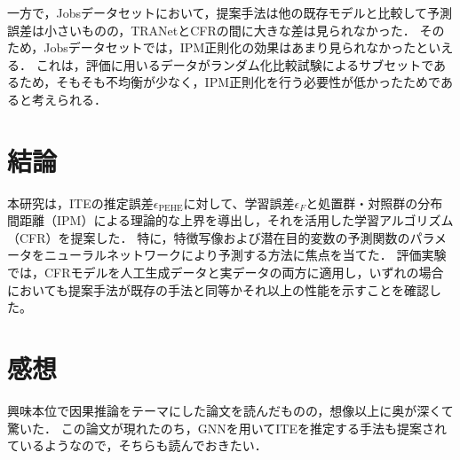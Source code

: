 \documentclass[dvipdfmx]{jreport}
\begin{document}
一方で，Jobsデータセットにおいて，提案手法は他の既存モデルと比較して予測誤差は小さいものの，TRANetとCFRの間に大きな差は見られなかった．
そのため，Jobsデータセットでは，IPM正則化の効果はあまり見られなかったといえる．
これは，評価に用いるデータがランダム化比較試験によるサブセットであるため，そもそも不均衡が少なく，IPM正則化を行う必要性が低かったためであると考えられる．

\newpage
\section{結論}
本研究は，ITEの推定誤差$\epsilon_{\mathrm{PEHE}}$に対して、学習誤差$\epsilon_{F}$と処置群・対照群の分布間距離（IPM）による理論的な上界を導出し，それを活用した学習アルゴリズム（CFR）を提案した．
特に，特徴写像および潜在目的変数の予測関数のパラメータをニューラルネットワークにより予測する方法に焦点を当てた．
評価実験では，CFRモデルを人工生成データと実データの両方に適用し，いずれの場合においても提案手法が既存の手法と同等かそれ以上の性能を示すことを確認した。

\section{感想}
興味本位で因果推論をテーマにした論文を読んだものの，想像以上に奥が深くて驚いた．
この論文が現れたのち，GNNを用いてITEを推定する手法も提案されているようなので，そちらも読んでおきたい．
\end{document}
